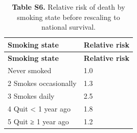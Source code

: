 \footnotesize
\begin{longtable}{ll}
\caption{\textbf{Table S6.} Relative risk of death by smoking state before rescaling to national survival.}\\
\toprule
\textbf{Smoking state} & \textbf{Relative risk} \\
\midrule
\endfirsthead
\toprule
\textbf{Smoking state} & \textbf{Relative risk} \\
\midrule
\endhead
\bottomrule
\endfoot
1 Never smoked & 1.0 \\
2 Smokes occasionally & 1.3 \\
3 Smokes daily & 2.5 \\
4 Quit < 1 year ago & 1.8 \\
5 Quit ≥ 1 year ago & 1.2 \\
\end{longtable}
\normalsize

